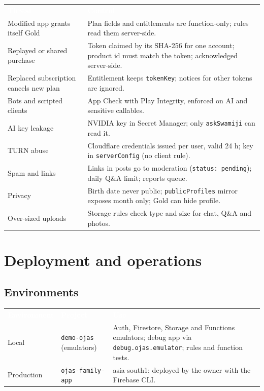 \documentclass[11pt,a4paper,oneside]{report}
\newcommand{\thead}[1]{\textcolor{white}{\bfseries #1}}
\newcommand{\headrow}{\rowcolor{ojDeep}}
\begin{document}
\begin{tabularx}{\textwidth}{@{}p{3.6cm}L@{}}
\headrow \thead{Threat} & \thead{Control} \\
Modified app grants itself Gold & Plan fields and entitlements are function-only; rules read them server-side. \\
Replayed or shared purchase & Token claimed by its SHA-256 for one account; product id must match the token; acknowledged server-side. \\
Replaced subscription cancels new plan & Entitlement keeps \texttt{tokenKey}; notices for other tokens are ignored. \\
Bots and scripted clients & App Check with Play Integrity, enforced on AI and sensitive callables. \\
AI key leakage & NVIDIA key in Secret Manager; only \texttt{askSwamiji} can read it. \\
TURN abuse & Cloudflare credentials issued per user, valid 24 h; key in \texttt{serverConfig} (no client rule). \\
Spam and links & Links in posts go to moderation (\texttt{status: pending}); daily Q\&A limit; reports queue. \\
Privacy & Birth date never public; \texttt{publicProfiles} mirror exposes month only; Gold can hide profile. \\
Over-sized uploads & Storage rules check type and size for chat, Q\&A and photos. \\
\bottomrule
\end{tabularx}

\chapter{Deployment and operations}

\section{Environments}
\begin{tabularx}{\textwidth}{@{}p{2.8cm}p{3.6cm}L@{}}
\headrow \thead{Environment} & \thead{Project} & \thead{Use} \\
Local & \texttt{demo-ojas} (emulators) & Auth, Firestore, Storage and Functions emulators; debug app via \texttt{debug.ojas.emulator}; rules and function tests. \\
Production & \texttt{ojas-family-app} & asia-south1; deployed by the owner with the Firebase CLI. \\
\bottomrule
\end{tabularx}
\end{document}
